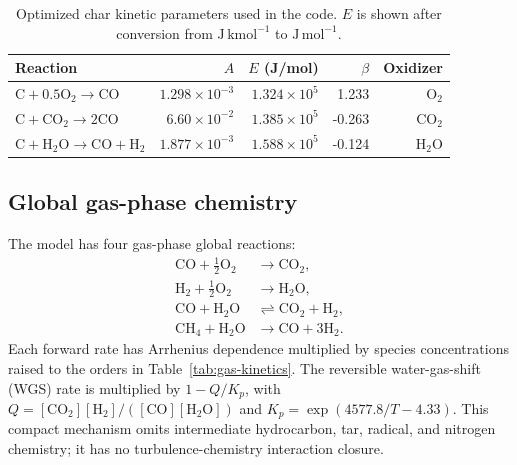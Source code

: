 \documentclass[journal]{IEEEtran}
\newcommand{\CO}{\mathrm{CO}}
\newcommand{\COtwo}{\mathrm{CO_2}}
\newcommand{\Htwo}{\mathrm{H_2}}
\newcommand{\HtwoO}{\mathrm{H_2O}}
\newcommand{\Otwo}{\mathrm{O_2}}
\newcommand{\CHfour}{\mathrm{CH_4}}
\begin{document}
\begin{table}[t]
\caption{Optimized char kinetic parameters used in the code. \(E\) is shown after conversion from \(\mathrm{J\,kmol^{-1}}\) to \(\mathrm{J\,mol^{-1}}\).}
\label{tab:char-kinetics}
\centering
\small
\begin{tabular}{lrrrr}
\toprule
Reaction & \(A\) & \(E\) (J/mol) & \(\beta\) & Oxidizer\\
\midrule
\(\mathrm{C+0.5O_2\rightarrow CO}\) & \(1.298{\times}10^{-3}\) & \(1.324{\times}10^5\) & 1.233 & \(\Otwo\)\\
\(\mathrm{C+CO_2\rightarrow2CO}\) & \(6.60{\times}10^{-2}\) & \(1.385{\times}10^5\) & -0.263 & \(\COtwo\)\\
\(\mathrm{C+H_2O\rightarrow CO+H_2}\) & \(1.877{\times}10^{-3}\) & \(1.588{\times}10^5\) & -0.124 & \(\HtwoO\)\\
\bottomrule
\end{tabular}
\end{table}

\subsection{Global gas-phase chemistry}
The model has four gas-phase global reactions:
\begin{align}
\CO+\tfrac12\Otwo &\rightarrow \COtwo, \\
\Htwo+\tfrac12\Otwo &\rightarrow \HtwoO, \\
\CO+\HtwoO &\rightleftharpoons \COtwo+\Htwo, \\
\CHfour+\HtwoO &\rightarrow \CO+3\Htwo.
\end{align}
Each forward rate has Arrhenius dependence multiplied by species concentrations raised to the orders in Table~\ref{tab:gas-kinetics}. The reversible water-gas-shift (WGS) rate is multiplied by \(1-Q/K_p\), with \(Q=[\COtwo][\Htwo]/([\CO][\HtwoO])\) and \(K_p=\exp(4577.8/T-4.33)\). This compact mechanism omits intermediate hydrocarbon, tar, radical, and nitrogen chemistry; it has no turbulence-chemistry interaction closure.
\end{document}
